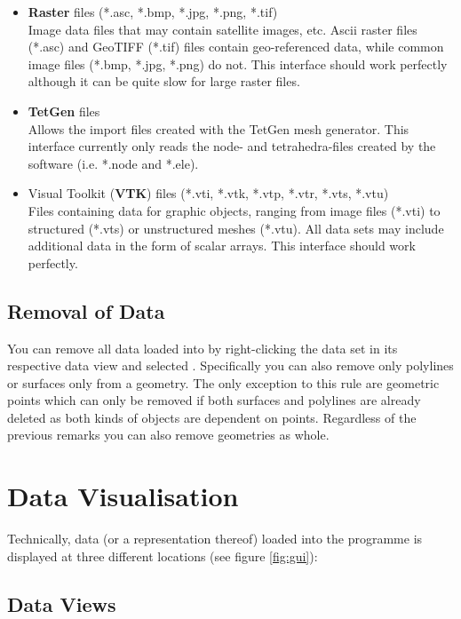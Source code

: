 \begin{itemize}
\item \textbf{Raster} files (*.asc, *.bmp, *.jpg, *.png, *.tif)\\
Image data files that may contain satellite images, etc. Ascii raster files (*.asc) and GeoTIFF (*.tif) files contain geo-referenced data, while common image files (*.bmp, *.jpg, *.png) do not. This interface should work perfectly although it can be quite slow for large raster files.
\item \textbf{TetGen} files\\
Allows the import files created with the TetGen mesh generator. This interface currently only reads the node- and tetrahedra-files created by the software (i.e. *.node and *.ele).
\item Visual Toolkit (\textbf{VTK}) files (*.vti, *.vtk, *.vtp, *.vtr, *.vts, *.vtu)\\
Files containing data for graphic objects, ranging from image files (*.vti) to structured (*.vts) or unstructured meshes (*.vtu). All data sets may include additional data in the form of scalar arrays. This interface should work perfectly.
\end{itemize}

\subsection{Removal of Data}

You can remove all data loaded into \ogs by right-clicking the data set in its respective data view and selected . Specifically you can also remove only polylines or surfaces only from a geometry. The only exception to this rule are geometric points which can only be removed if both surfaces and polylines are already deleted as both kinds of objects are dependent on points. Regardless of the previous remarks you can also remove geometries as whole.

\section{Data Visualisation}
\label{datavisualisation}

Technically, data (or a representation thereof) loaded into the programme is displayed at three different locations (see figure \ref{fig:gui}):

\subsection{Data Views}

